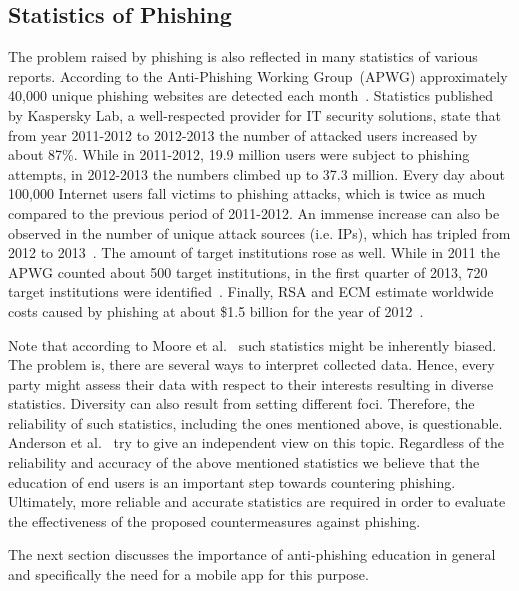 \subsection{Statistics of Phishing}
\label{s:stats}
The problem raised by phishing is also reflected in many statistics of various reports. 
 According to the Anti-Phishing Working Group~(APWG) approximately 40,000 unique phishing websites are detected each month~\cite{antiphishingtrendreport2013}. Statistics published by Kaspersky Lab, a well-respected provider for IT security solutions, state that from year 2011-2012 to 2012-2013 the number of attacked users increased by about 87\%. 
While in 2011-2012, 19.9 million users were subject to phishing attempts, in 2012-2013 the numbers climbed up to 37.3 million. 
 Every day about 100,000 Internet users fall victims to phishing attacks, which is twice as much compared to the previous period of 2011-2012. An immense increase can also be observed in the number of unique attack sources (i.e. IPs), which has tripled from 2012 to 2013~\cite{kasperskyreport2013}. The amount of target institutions rose as well. 
 While in 2011 the APWG counted about 500 target institutions, in the first quarter of 2013, 720 target institutions were identified~\cite{antiphishingglobalreport2013}. 
Finally, RSA and ECM estimate worldwide costs caused by phishing at about \$1.5 billion for the year of 2012~\cite{rsa2013}. 

Note that according to Moore et al.~\cite{moore2010hard} such statistics might be inherently biased. 
The problem is, there are several ways to interpret collected data. 
Hence, every party might assess their data with respect to their interests resulting in diverse statistics. 
Diversity can also result from setting different foci.
Therefore, the reliability of such statistics, including the ones mentioned above, is questionable. 
Anderson et al.~\cite{anderson2012measuring} try to give an independent view on this topic.
Regardless of the reliability and accuracy of the above mentioned statistics we believe that the education of end users is an important step towards countering phishing. 
Ultimately, more reliable and accurate statistics are required in order to evaluate the effectiveness of the proposed countermeasures against phishing. 

The next section discusses the importance of anti-phishing education in general and specifically the need for a mobile app for this purpose.
